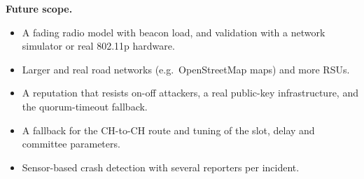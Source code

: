 \documentclass[11pt, a4paper]{article}
\begin{document}
\noindent\textbf{Future scope.}
\begin{itemize}[noitemsep, topsep=2pt]
  \item A fading radio model with beacon load, and validation with a network simulator or real 802.11p hardware.
  \item Larger and real road networks (e.g.\ OpenStreetMap maps) and more RSUs.
  \item A reputation that resists on-off attackers, a real public-key infrastructure, and the quorum-timeout fallback.
  \item A fallback for the CH-to-CH route and tuning of the slot, delay and committee parameters.
  \item Sensor-based crash detection with several reporters per incident.
\end{itemize}

\end{document}
